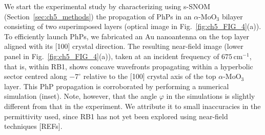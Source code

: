 We start the experimental study by characterizing using s-SNOM (Section~\ref{sec:ch5_methods}) the propagation of PhPs in an $\alpha\text{-}\mathrm{MoO}_3$ bilayer consisting of two superimposed layers (optical image in Fig.~\ref{fig:ch5_FIG_4}(a)). To efficiently launch PhPs, we fabricated an Au nanoantenna on the top layer aligned with its [100] crystal direction. The resulting near-field image (lower panel in Fig.~\ref{fig:ch5_FIG_4}(a)), taken at an incident frequency of $675\,\mathrm{cm}^{-1}$, that is, within RB1, shows concave wavefronts propagating within a hyperbolic sector centred along $-7^\circ$ relative to the [100] crystal axis of the top $\alpha\text{-}\mathrm{MoO}_3$ layer. This PhP propagation is corroborated by performing a numerical simulation (inset). Note, however, that the angle $\varphi$ in the simulations is slightly different from that in the experiment. We attribute it to small inaccuracies in the permittivity used, since RB1 has not yet been explored using near-field techniques [REFs].


